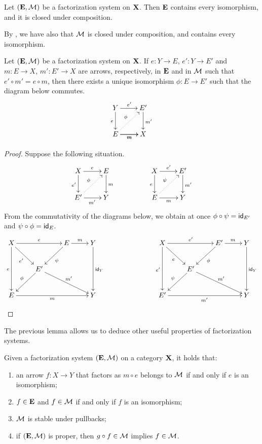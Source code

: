 \begin{proposition}
	Let $(\textbf {\textup{E}}, \mathcal{M})$ be a factorization system on $\textbf {\textup{X}}$. Then $\textbf {\textup{E}}$ contains every isomorphism, and it is closed under composition.
\end{proposition}

By , we have also that $\mathcal{M}$ is closed under composition, and contains every isomorphism.

\begin{lemma}
	Let $(\textbf {\textup{E}}, \mathcal{M})$ be a factorization system on $\textbf {\textup{X}}$. If $e:Y \to E$, $e': Y\to E'$ and $m: E \to X$, $m':E'\to X$ are arrows, respectively, in $\textbf {\textup{E}}$ and in $\mathcal{M}$ such that $e'\circ m' = e \circ m$,
	then there exists a unique isomorphism $\phi: E \to E'$ such that the diagram below commutes.
	\[\xymatrix{Y\ar[r]^{e'}\ar[d]_{e}&E'\ar[d]^{m'}\\E\ar[r]_{m}\ar@{.>}[ur]^{\phi}\ar[r]_{m}&X}\]
\end{lemma}

\begin{proof}
	Suppose the following situation.
	\[\xymatrix{X \ar[r]^e\ar[d]_{e'}&E\ar[d]^{m}&&X\ar[r]^{e'}\ar[d]_{e}&{E'}\ar[d]^{m'}\\{E'}\ar[r]_{m'}\ar@{.>}[ur]^{\phi}&Y&&E\ar[r]_{m}\ar@{.>}[ur]^{\psi}&Y}\]
	From the commutativity of the diagrams below, we obtain at once $\phi\circ\psi=\mathsf{id}_{E'}$ and $\psi\circ\phi=\mathsf{id}_{E}$.
	\[\xymatrix{
			X\ar[rr]^{e}\ar[dd]_{e}\ar[dr]_{e'}&&E\ar[r]^{m}\ar[dl]^{\psi}&Y\ar[dd]^{\id{Y}} &&& X\ar[rr]^{e'}\ar[dd]_{e'}\ar[dr]_{e}&&{E'}\ar[r]^{m}\ar[dl]^{\phi}&Y\ar[dd]^{\id{Y}}\\
							     & {E'}\ar[dl]_{\phi}\ar[drr]^{m'}& & &&&  & {E'}\ar[dl]_{\psi}\ar[drr]^{m'}& & \\
			E\ar[rrr]_{m} &&& Y &&& {E'} \ar[rrr]_{m'} &&& Y
	}\]
\end{proof}

The previous lemma allows us to deduce other useful properties of factorization systems.

\begin{proposition}
	Given a factorization system $(\textbf {\textup{E}}, \mathcal{M})$ on a category $\textbf {\textup{X}}$, it holds that:
	\begin{enumerate}
		\item an arrow $f:X\to Y$ that factors as $m \circ e$ belongs to $\mathcal{M}$ if and only if $e$ is an isomorphism;
		\item $f\in \textbf {\textup{E}}$ and $f\in\mathcal{M}$ if and only if $f$ is an isomorphism;
		\item $\mathcal{M}$ is stable under pullbacks;
		\item if $(\textbf {\textup{E}}, \mathcal{M})$ is proper, then $g\circ f \in \mathcal{M}$ implies $f \in \mathcal{M}$.
	\end{enumerate}
\end{proposition}



